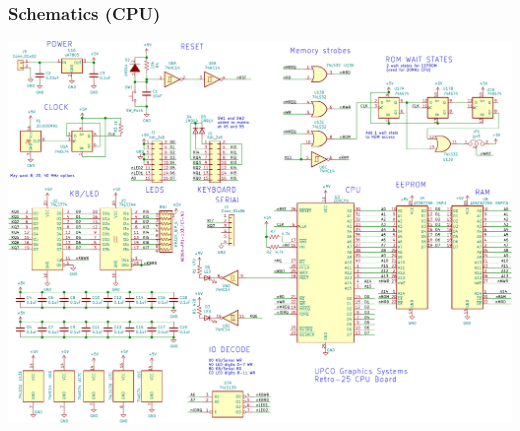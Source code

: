 \documentclass{beamer}
\begin{document}
\begin{frame}
  \frametitle{Schematics (CPU)}

  \vskip -0.2in
  \includegraphics[width=\textwidth]{figs/cpu-sch-crop.pdf}

\end{frame}
\end{document}

